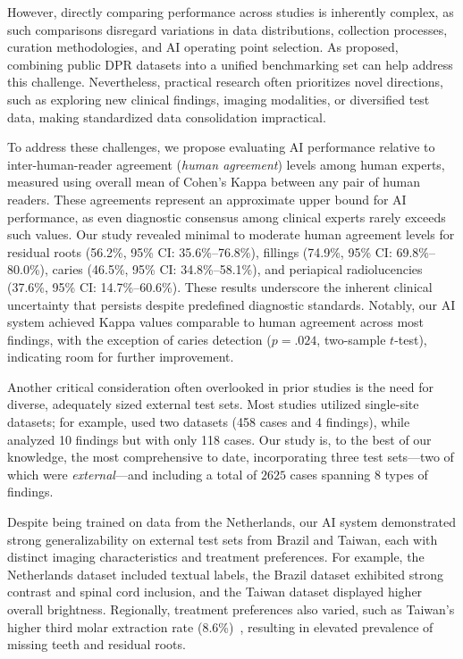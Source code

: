 However, directly comparing performance across studies is inherently complex, as such comparisons disregard variations in data distributions, collection processes, curation methodologies, and AI operating point selection.
As \citet{van2024combining} proposed, combining public DPR datasets into a unified benchmarking set can help address this challenge.
Nevertheless, practical research often prioritizes novel directions, such as exploring new clinical findings, imaging modalities, or diversified test data, making standardized data consolidation impractical.

To address these challenges, we propose evaluating AI performance relative to inter-human-reader agreement (\emph{human agreement}) levels among human experts, measured using overall mean of Cohen's Kappa between any pair of human readers.
These agreements represent an approximate upper bound for AI performance, as even diagnostic consensus among clinical experts rarely exceeds such values. 
Our study revealed minimal to moderate human agreement levels for residual roots (56.2\%, 95\% CI: 35.6\%--76.8\%), fillings (74.9\%, 95\% CI: 69.8\%--80.0\%), caries (46.5\%, 95\% CI: 34.8\%--58.1\%), and periapical radiolucencies (37.6\%, 95\% CI: 14.7\%--60.6\%). 
These results underscore the inherent clinical uncertainty that persists despite predefined diagnostic standards. 
Notably, our AI system achieved Kappa values comparable to human agreement across most findings, with the exception of caries detection ($p = .024$, two-sample $t$-test), indicating room for further improvement.


Another critical consideration often overlooked in prior studies is the need for diverse, adequately sized external test sets.
Most studies utilized single-site datasets; for example, \citet{van2024combining} used two datasets (458 cases and 4 findings), while \citet{bacsaran2022diagnostic} analyzed 10 findings but with only 118 cases.
Our study is, to the best of our knowledge, the most comprehensive to date, incorporating three test sets---two of which were \emph{external}---and including a total of $\num{2625}$ cases spanning 8 types of findings.

Despite being trained on data from the Netherlands, our AI system demonstrated strong generalizability on external test sets from Brazil and Taiwan, each with distinct imaging characteristics and treatment preferences.
For example, the Netherlands dataset included textual labels, the Brazil dataset exhibited strong contrast and spinal cord inclusion, and the Taiwan dataset displayed higher overall brightness.
Regionally, treatment preferences also varied, such as Taiwan's higher third molar extraction rate (8.6\%)~\citep{liang2022tooth}, resulting in elevated prevalence of missing teeth and residual roots.

